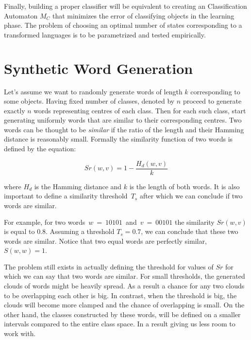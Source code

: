 \documentclass{mini}
\begin{document}
Finally, building a proper classifier will be equivalent to creating an Classification Automaton $M_{C}$ that minimizes the error of classifying objects in the learning phase. The problem of choosing an optimal number of states corresponding to a transformed languages is to be parametrized and tested empirically.

\section{Synthetic Word Generation} \label{sec:lan_theory_synth_word_gen}
 
Let's assume we want to randomly generate words of length $k$ corresponding to some objects. Having fixed number of classes, denoted by $n$ proceed to generate exactly $n$ words representing centres of each class. Then for each such class, start generating uniformly words that are similar to their corresponding centres. Two words can be thought to be \textit{similar} if the ratio of the length and their Hamming distance is reasonably small. Formally the similarity function of two words is defined by the equation:

\begin{equation}
Sr(w,v) = 1 - \frac{H_d(w,v)}{k}
\end{equation}

where $H_d$ is the Hamming distance and $k$ is the length of both words. It is also important to define a similarity threshold~$T_s$ after which we can conclude if two words are similar.

For example, for two words~$w~=~10101$~and~$v~=~00101$ the similarity $Sr(w, v)$ is equal to $0.8$. Assuming a threshold $T_s = 0.7$, we can conclude that these two words are similar. Notice that two equal words are perfectly similar, $S(w,w) = 1$.

The problem still exists in actually defining the threshold for values of $Sr$ for which we can say that two words are similar. For small thresholds, the generated clouds of words might be heavily spread. As a result a chance for any two clouds to be overlapping each other is big. In contrast, when the threshold is big, the clouds will become more clamped and the chance of overlapping is small. On the other hand, the classes constructed by these words, will be defined on a smaller intervals compared to the entire class space. In a result giving us less room to work with.
\end{document}
